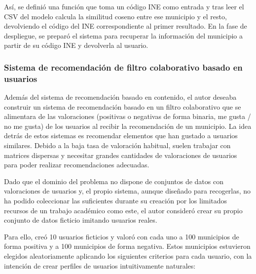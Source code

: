 Así, se definió una función que toma un código INE como entrada y tras leer el CSV del modelo calcula la similitud coseno entre ese municipio y el resto, devolviendo el código del INE correspondiente al primer resultado. En la fase de despliegue, se preparó el sistema para recuperar la información del municipio a partir de su código INE y devolverla al usuario.

\subsubsection{Sistema de recomendación de filtro colaborativo basado en usuarios}

Además del sistema de recomendación basado en contenido, el autor deseaba construir un sistema de recomendación basado en un filtro colaborativo que se alimentara de las valoraciones (positivas o negativas de forma binaria, \guillemotleft me gusta / no me gusta\guillemotright\space) de los usuarios al recibir la recomendación de un municipio. La idea detrás de estos sistemas es recomendar elementos que han gustado a usuarios similares. Debido a la baja tasa de valoración habitual, suelen trabajar con matrices dispersas y necesitar grandes cantidades de valoraciones de usuarios para poder realizar recomendaciones adecuadas.

Dado que el dominio del problema no dispone de conjuntos de datos con valoraciones de usuarios y, el propio sistema, aunque diseñado para recogerlas, no ha podido coleccionar las suficientes durante su creación por los limitados recursos de un trabajo académico como este, el autor consideró crear su propio conjunto de datos ficticio imitando usuarios reales.

Para ello, creó 10 usuarios ficticios y valoró con cada uno a 100 municipios de forma positiva y a 100 municipios de forma negativa. Estos municipios estuvieron elegidos aleatoriamente aplicando los siguientes criterios para cada usuario, con la intención de crear perfiles de usuarios intuitivamente naturales:


